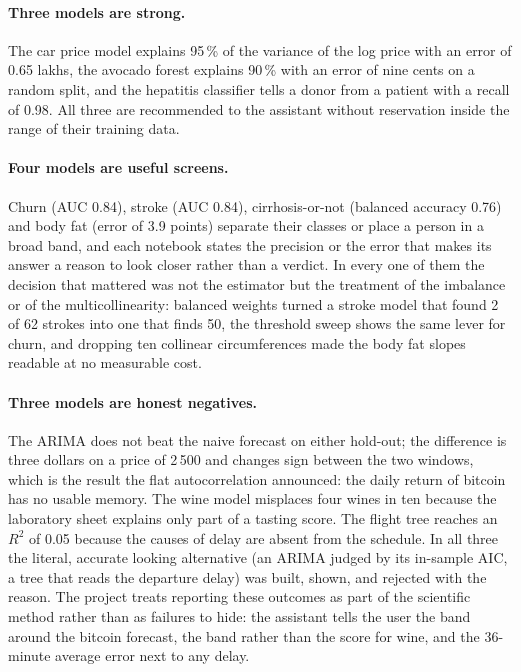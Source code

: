 \paragraph{Three models are strong.}
The car price model explains 95\,\% of the variance of the log price with
an error of 0.65 lakhs, the avocado forest explains 90\,\% with an error of
nine cents on a random split, and the hepatitis classifier tells a donor
from a patient with a recall of 0.98. All three are recommended to the
assistant without reservation inside the range of their training data.

\paragraph{Four models are useful screens.}
Churn (AUC 0.84), stroke (AUC 0.84), cirrhosis-or-not (balanced accuracy
0.76) and body fat (error of 3.9 points) separate their classes or place a
person in a broad band, and each notebook states the precision or the error
that makes its answer a reason to look closer rather than a verdict. In
every one of them the decision that mattered was not the estimator but the
treatment of the imbalance or of the multicollinearity: balanced weights
turned a stroke model that found 2 of 62 strokes into one that finds 50,
the threshold sweep shows the same lever for churn, and dropping ten collinear
circumferences made the body fat slopes readable at no measurable cost.

\paragraph{Three models are honest negatives.}
The ARIMA does not beat the naive forecast on either hold-out; the
difference is three dollars on a price of 2\,500 and changes sign between
the two windows, which is the result the flat autocorrelation announced:
the daily return of bitcoin has no usable memory. The wine model misplaces
four wines in ten because the laboratory sheet explains only part of a
tasting score. The flight tree reaches an $R^2$ of 0.05 because the causes
of delay are absent from the schedule. In all three the literal, accurate
looking alternative (an ARIMA judged by its in-sample AIC, a tree that
reads the departure delay) was built, shown, and rejected with the reason.
The project treats reporting these outcomes as part of the scientific
method rather than as failures to hide: the assistant tells the user the
band around the bitcoin forecast, the band rather than the score for wine,
and the 36-minute average error next to any delay.

